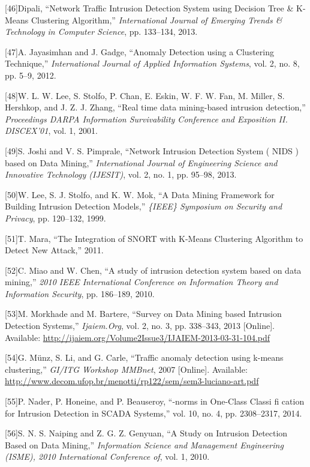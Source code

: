 \documentclass[11pt,a4paper]{article}
\begin{document}
{[}46{]}Dipali, ``Network Traffic Intrusion Detection System using
Decision Tree \& K-Means Clustering Algorithm,'' \emph{International
Journal of Emerging Trends \& Technology in Computer Science}, pp.
133--134, 2013.

{[}47{]}A. Jayasimhan and J. Gadge, ``Anomaly Detection using a
Clustering Technique,'' \emph{International Journal of Applied
Information Systems}, vol. 2, no. 8, pp. 5--9, 2012.

{[}48{]}W. L. W. Lee, S. Stolfo, P. Chan, E. Eskin, W. F. W. Fan, M.
Miller, S. Hershkop, and J. Z. J. Zhang, ``Real time data mining-based
intrusion detection,'' \emph{Proceedings DARPA Information Survivability
Conference and Exposition II. DISCEX'01}, vol. 1, 2001.

{[}49{]}S. Joshi and V. S. Pimprale, ``Network Intrusion Detection
System ( NIDS ) based on Data Mining,'' \emph{International Journal of
Engineering Science and Innovative Technology (IJESIT)}, vol. 2, no. 1,
pp. 95--98, 2013.

{[}50{]}W. Lee, S. J. Stolfo, and K. W. Mok, ``A Data Mining Framework
for Building Intrusion Detection Models,'' \emph{\{IEEE\} Symposium on
Security and Privacy}, pp. 120--132, 1999.

{[}51{]}T. Mara, ``The Integration of SNORT with K-Means Clustering
Algorithm to Detect New Attack,'' 2011.

{[}52{]}C. Miao and W. Chen, ``A study of intrusion detection system
based on data mining,'' \emph{2010 IEEE International Conference on
Information Theory and Information Security}, pp. 186--189, 2010.

{[}53{]}M. Morkhade and M. Bartere, ``Survey on Data Mining based
Intrusion Detection Systems,'' \emph{Ijaiem.Org}, vol. 2, no. 3, pp.
338--343, 2013 {[}Online{]}. Available:
\url{http://ijaiem.org/Volume2Issue3/IJAIEM-2013-03-31-104.pdf}

{[}54{]}G. Münz, S. Li, and G. Carle, ``Traffic anomaly detection using
k-means clustering,'' \emph{GI/ITG Workshop MMBnet}, 2007 {[}Online{]}.
Available:
\url{http://www.decom.ufop.br/menotti/rp122/sem/sem3-luciano-art.pdf}

{[}55{]}P. Nader, P. Honeine, and P. Beauseroy, ``-norms in One-Class
Classi fi cation for Intrusion Detection in SCADA Systems,'' vol. 10,
no. 4, pp. 2308--2317, 2014.

{[}56{]}S. N. S. Naiping and Z. G. Z. Genyuan, ``A Study on Intrusion
Detection Based on Data Mining,'' \emph{Information Science and
Management Engineering (ISME), 2010 International Conference of}, vol.
1, 2010.
\end{document}
